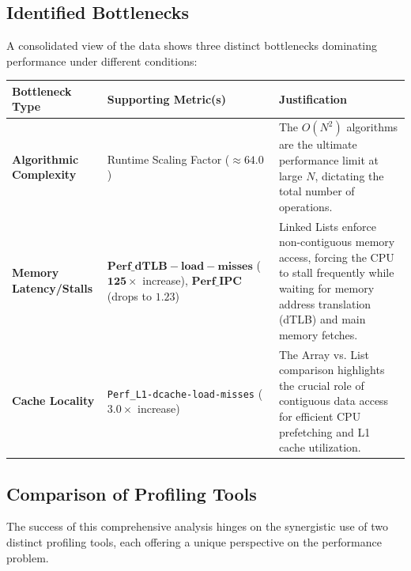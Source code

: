 \documentclass[11pt, a4paper]{article}
\begin{document}
\subsection{Identified Bottlenecks}
A consolidated view of the data shows three distinct bottlenecks dominating performance under different conditions:
\begin{longtable}{p{} p{} p{}}
\toprule
\textbf{Bottleneck Type} & \textbf{Supporting Metric(s)} & \textbf{Justification} \\
\midrule
\textbf{Algorithmic Complexity} & Runtime Scaling Factor ($\approx 64.0$) & The $O(N^2)$ algorithms are the ultimate performance limit at large $N$, dictating the total number of operations. \\
\midrule
\textbf{Memory Latency/Stalls} & $\mathbf{Perf\_dTLB-load-misses}$ ($\mathbf{125\times}$ increase), $\mathbf{Perf\_IPC}$ (drops to $1.23$) & Linked Lists enforce non-contiguous memory access, forcing the CPU to stall frequently while waiting for memory address translation (dTLB) and main memory fetches. \\
\midrule
\textbf{Cache Locality} & \texttt{Perf\_L1-dcache-load-misses} ($\mathbf{3.0\times}$ increase) & The Array vs. List comparison highlights the crucial role of contiguous data access for efficient CPU prefetching and L1 cache utilization. \\
\bottomrule
\end{longtable}

\subsection{Comparison of Profiling Tools}
The success of this comprehensive analysis hinges on the synergistic use of two distinct profiling tools, each offering a unique perspective on the performance problem.
\end{document}
